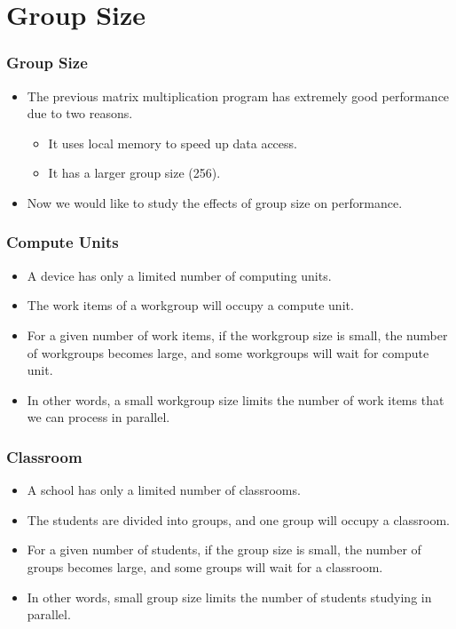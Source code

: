 \documentclass{beamer}
\begin{document}
\section{Group Size}

\begin{frame}
  \frametitle{Group Size}
  \begin{itemize}
  \item The previous matrix multiplication program has extremely good
    performance due to two reasons.
    \begin{itemize}
      \item It uses local memory to speed up data access.
      \item It has a larger group size (256).
    \end{itemize}
    \item Now we would like to study the effects of group size on
      performance.
  \end{itemize}
\end{frame}

\begin{frame}
  \frametitle{Compute Units}
  \begin{itemize}
    \item A device has only a limited number of computing units.
    \item The work items of a workgroup will occupy a compute unit.
    \item For a given number of work items, if the workgroup size is
      small, the number of workgroups becomes large, and some
      workgroups will wait for compute unit.
    \item In other words, a small workgroup size limits the 
      number of work items that we can process in parallel.
  \end{itemize}
\end{frame}

\begin{frame}
  \frametitle{Classroom}
  \begin{itemize}
    \item A school has only a limited number of classrooms.
    \item The students are divided into groups, and one group will
      occupy a classroom.
    \item For a given number of students, if the group size is small,
      the number of groups becomes large, and some groups will
      wait for a classroom.
    \item In other words, small group size limits the number of
      students studying in parallel.
  \end{itemize}
\end{frame}
\end{document}
